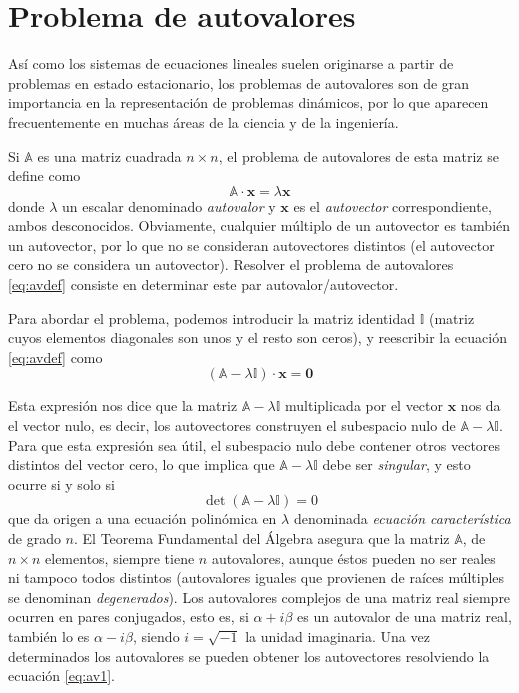 

\section{Problema de autovalores}

Así como los sistemas de ecuaciones lineales suelen originarse a partir de problemas en estado estacionario, los problemas de autovalores son de gran importancia en la representación de problemas dinámicos, por lo que aparecen frecuentemente en muchas áreas de la ciencia y de la ingeniería.

Si $\mathbb{A}$ es una matriz cuadrada $n \times n$, el problema de autovalores de esta matriz se define como
\begin{equation}\label{eq:avdef}
 \mathbb{A} \cdot \bm{x} = \lambda \bm{x}
\end{equation} 
donde $\lambda$ un escalar denominado \textit{autovalor} y $\bm{x}$ es el \textit{autovector} correspondiente, ambos desconocidos. Obviamente, cualquier múltiplo de un autovector es también un autovector, por lo que no se consideran autovectores distintos (el autovector cero no se considera un autovector). Resolver el problema de autovalores \eqref{eq:avdef} consiste en determinar este par autovalor/autovector.

Para abordar el problema, podemos introducir la matriz identidad $\mathbb{I}$ (matriz cuyos elementos diagonales son unos y el resto son ceros), y reescribir la ecuación \eqref{eq:avdef} como
\begin{equation}\label{eq:av1}
 (\mathbb{A} - \lambda \mathbb{I}) \cdot \bm{x} = \bm{0}
\end{equation} 

Esta expresión nos dice que la matriz $\mathbb{A} - \lambda \mathbb{I}$ multiplicada por el vector $\bm{x}$ nos da el vector nulo, es decir, los autovectores construyen el subespacio nulo de $\mathbb{A} - \lambda \mathbb{I}$. Para que esta expresión sea útil, el subespacio nulo debe contener otros vectores distintos del vector cero, lo que implica que $\mathbb{A} - \lambda \mathbb{I}$ debe ser \textit{singular}, y esto ocurre si y solo si
\begin{equation}\label{eq:avcaract}
 \det(\mathbb{A} - \lambda \mathbb{I}) = 0
\end{equation} 
que da origen a una ecuación polinómica en $\lambda$ denominada \textit{ecuación característica} de grado $n$. El Teorema Fundamental del Álgebra asegura que la matriz $\mathbb{A}$, de $n \times n$ elementos, siempre tiene $n$ autovalores, aunque éstos pueden no ser reales ni tampoco todos distintos (autovalores iguales que provienen de raíces múltiples se denominan \textit{degenerados}). Los autovalores complejos de una matriz real siempre ocurren en pares conjugados, esto es, si $\alpha + i \beta$ es un autovalor de una matriz real, también lo es $\alpha - i \beta$, siendo $i = \sqrt{-1}$ la unidad imaginaria. Una vez determinados los autovalores se pueden obtener los autovectores resolviendo la ecuación \eqref{eq:av1}.

